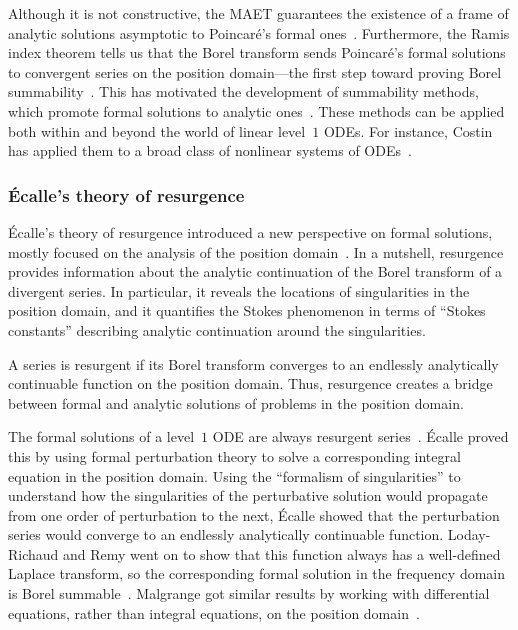 \documentclass[pdftex]{sigma}
\numberwithin{equation}{section}
\begin{document}
Although it is not constructive, the MAET guarantees the existence of a frame of analytic solutions asymptotic to Poincar\'e's formal ones~\cite[Chapter~14]{balser}. Furthermore, the Ramis index theorem tells us that the Borel transform sends Poincar\'e's formal solutions to convergent series on the position domain---the first step toward proving Borel summability~\cite{ramis_index}. This has motivated the development of summability methods, which promote formal solutions to analytic ones~\cite{diverg-resurg--ii,malgrange--fourier,malgrange1995sommation,malgrange92,ramis1991series}. These methods can be applied both within and beyond the world of linear level~$1$ ODEs. For instance, Costin has applied them to a broad class of nonlinear systems of ODEs~\cite{Costin:borel-sum-non-linear}.
%
\subsubsection{\'{E}calle's theory of resurgence}
%
\'{E}calle's theory of resurgence introduced a new perspective on formal solutions, mostly focused on the analysis of the position domain~\cite{EcalleIII,loday-Remy2011}. In a nutshell, resurgence provides information about the analytic continuation of the Borel transform of a divergent series. In particular, it reveals the locations of singularities in the position domain, and it quantifies the Stokes phenomenon in terms of ``Stokes constants'' describing analytic continuation around the singularities.

A series is resurgent if its Borel transform converges to an endlessly analytically continuable function on the position domain. Thus, resurgence creates a bridge between formal and analytic solutions of problems in the position domain.

The formal solutions of a level~$1$ ODE are always resurgent series~\cite[Proposition~2.2.1]{EcalleIII}. \'{E}calle proved this by using formal perturbation theory to solve a corresponding integral equation in the position domain. Using the ``formalism of singularities'' to understand how the singularities of the perturbative solution would propagate from one order of perturbation to the next, \'{E}calle showed that the perturbation series would converge to an endlessly analytically continuable function. Loday-Richaud and Remy went on to show that this function always has a well-defined Laplace transform, so the corresponding formal solution in the frequency domain is Borel summable~\cite{loday-Remy2011}. Malgrange got similar results by working with differential equations, rather than integral equations, on the position domain~\cite{malgrange--fourier}.
\end{document}
